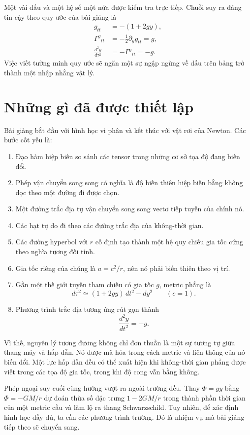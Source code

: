 Một vài dấu và một hệ số một nửa được kiểm tra trực tiếp. Chuỗi suy ra đáng tin cậy theo quy ước của bài giảng là
\begin{equation}
\begin{aligned}
g_{tt}&=-(1+2gy),\\
\Gamma^y{}_{tt}&=-\frac12\partial_yg_{tt}=g,\\
\frac{d^2y}{d\tau^2}&=-\Gamma^y{}_{tt}=-g.
\end{aligned}
\end{equation}
Việc viết tường minh quy ước sẽ ngăn một sự ngập ngừng về dấu trên bảng trở thành một nhập nhằng vật lý.

\section{Những gì đã được thiết lập}

Bài giảng bắt đầu với hình học vi phân và kết thúc với vật rơi của Newton. Các bước cốt yếu là:
\begin{enumerate}
\item Đạo hàm hiệp biến so sánh các tensor trong những cơ sở tọa độ đang biến đổi.
\item Phép vận chuyển song song có nghĩa là độ biến thiên hiệp biến bằng không dọc theo một đường đi được chọn.
\item Một đường trắc địa tự vận chuyển song song vectơ tiếp tuyến của chính nó.
\item Các hạt tự do đi theo các đường trắc địa của không-thời gian.
\item Các đường hyperbol với \(r\) cố định tạo thành một hệ quy chiếu gia tốc cứng theo nghĩa tương đối tính.
\item Gia tốc riêng của chúng là \(a=c^2/r\), nên nó phải biến thiên theo vị trí.
\item Gần một thế giới tuyến tham chiếu có gia tốc \(g\), metric phẳng là
\begin{equation}
d\tau^2\simeq(1+2gy)\,dt^2-dy^2
\qquad(c=1).
\end{equation}
\item Phương trình trắc địa tương ứng rút gọn thành
\begin{equation}
\frac{d^2y}{dt^2}=-g.
\end{equation}
\end{enumerate}

Vì thế, nguyên lý tương đương không chỉ đơn thuần là một sự tương tự giữa thang máy và hấp dẫn. Nó được mã hóa trong cách metric và liên thông của nó biến đổi. Một lực hấp dẫn đều có thể xuất hiện khi không-thời gian phẳng được viết trong các tọa độ gia tốc, trong khi độ cong vẫn bằng không.

Phép ngoại suy cuối cùng hướng vượt ra ngoài trường đều. Thay \(\Phi=gy\) bằng \(\Phi=-GM/r\) dự đoán thừa số đặc trưng \(1-2GM/r\) trong thành phần thời gian của một metric cầu và làm lộ ra thang Schwarzschild. Tuy nhiên, để xác định hình học đầy đủ, ta cần các phương trình trường. Đó là nhiệm vụ mà bài giảng tiếp theo sẽ chuyển sang.
